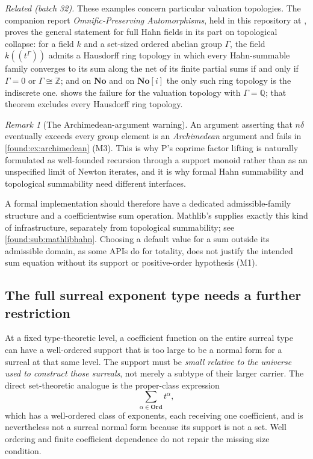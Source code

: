 \documentclass[11pt,letterpaper]{article}
\numberwithin{equation}{section}
\theoremstyle{definition}
\theoremstyle{remark}
\newtheorem{remark}[theorem]{Remark}
\newcommand{\No}{\mathbf{No}}
\newcommand{\Ord}{\mathbf{Ord}}
\newcommand{\Q}{\mathbb Q}
\newcommand{\Z}{\mathbb Z}
\begin{document}
\emph{Related (batch 32).} These examples concern particular valuation
topologies. The companion report \emph{Omnific-Preserving Automorphisms}, held
in this repository at ,
proves the general statement for full Hahn fields in its part on topological
collapse: for a field $k$ and a set-sized ordered abelian group $\Gamma$, the
field $k((t^\Gamma))$ admits a Hausdorff ring topology in which every
Hahn-summable family converges to its sum along the net of its finite partial
sums if and only if $\Gamma=0$ or $\Gamma\cong\Z$; and on $\No$ and on $\No[i]$
the only such ring topology is the indiscrete one.
 shows the failure for the valuation topology with
$\Gamma=\Q$; that theorem excludes every Hausdorff ring topology.

\begin{remark}[The Archimedean-argument warning]\label{found:rem:archimedean}
An argument asserting that $n\delta$ eventually exceeds every group element is
an \emph{Archimedean} argument and fails in \cref{found:ex:archimedean} (M3).
This is why P's coprime factor lifting is naturally formulated as well-founded
recursion through a support monoid rather than as an unspecified limit of Newton
iterates, and it is why formal Hahn summability and topological summability need
different interfaces.
\end{remark}

A formal implementation should therefore have a dedicated admissible-family
structure and a coefficientwise sum operation. Mathlib's
 supplies exactly this kind of infrastructure,
separately from topological summability; see \cref{found:sub:mathlibhahn}.
Choosing a default value for a sum outside its admissible domain, as some APIs
do for totality, does not justify the intended sum equation without its support
or positive-order hypothesis (M1).

\subsection{The full surreal exponent type needs a further restriction}
\label{found:sub:toolarge}
At a fixed type-theoretic level, a coefficient function on the entire surreal
type can have a well-ordered support that is too large to be a normal form for a
surreal at that same level. The support must be \emph{small relative to the
universe used to construct those surreals}, not merely a subtype of their larger
carrier. The direct set-theoretic analogue is the proper-class expression
\begin{equation}\label{found:eq:toolarge}
 \sum_{\alpha\in\Ord}t^\alpha,
\end{equation}
which has a well-ordered class of exponents, each receiving one coefficient, and
is nevertheless not a surreal normal form because its support is not a set. Well
ordering and finite coefficient dependence do not repair the missing size
condition.
\end{document}
